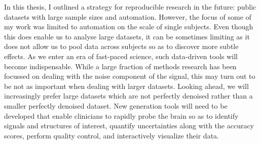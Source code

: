 In this thesis, I outlined a strategy for reproducible research in the future: public datasets with large sample sizes and automation. However, the focus of some of my work was limited to automation on the scale of single subjects. Even though this does enable us to analyse large datasets, it can be sometimes limiting as it does not allow us to pool data across subjects so as to discover more subtle effects. As we enter an era of fast-paced science, such data-driven tools will become indispensable. While a large fraction of methods research has been focussed on dealing with the noise component of the signal, this may turn out to be not as important when dealing with larger datasets. Looking ahead, we will increasingly prefer large datasets which are not perfectly denoised rather than a smaller perfectly denoised dataset. New generation tools will need to be developed that enable clinicians to rapidly probe the brain so as to identify signals and structures of interest, quantify uncertainties along with the accuracy scores, perform quality control, and interactively visualize their data.
